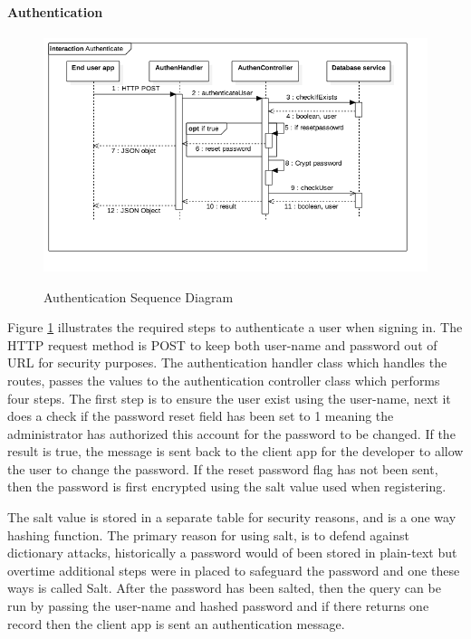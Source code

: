 \paragraph{Authentication}

\begin{figure}[!h]
    \caption{Authentication Sequence Diagram}
    \centering
    \includegraphics[width=150mm]{images/sequence/Authenticate}
    \label{fig:authenticate-seq}
\end{figure}

Figure \ref{fig:authenticate-seq} illustrates the required steps to authenticate a user when signing in. The HTTP request method is POST to keep both user-name and password out of URL for security purposes. The authentication handler class which handles the routes, passes the values to the authentication controller class which performs four steps. The first step is to ensure the user exist using the user-name, next it does a check if the password reset field has been set to 1 meaning the administrator has authorized this account for the password to be changed. If the result is true, the message is sent back to the client app for the developer to allow the user to change the password. If the reset password flag has not been sent, then the password is first encrypted using the salt value used when registering. 

The salt value is stored in a separate table for security reasons, and is a one way hashing function. The primary reason for using salt, is to defend against dictionary attacks, historically a password would of been stored in plain-text but overtime additional steps were in placed to safeguard the password and one these ways is called Salt. After the password has been salted, then the query can be run by passing the user-name and hashed password and if there returns one record then the client app is sent an authentication message. 


